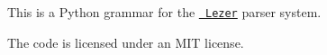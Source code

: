 This is a Python grammar for the \href{https://lezer.codemirror.net/}{\texttt{ Lezer}} parser system.

The code is licensed under an M\+IT license. 